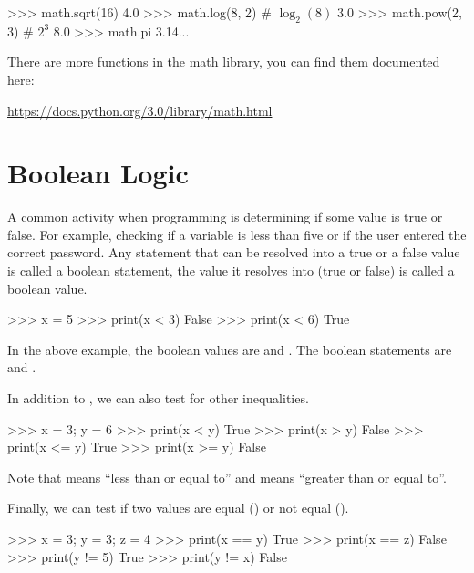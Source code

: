\documentclass[11pt]{cselabheader}
\begin{document}
\begin{pyconcode}
>>> math.sqrt(16)
4.0
>>> math.log(8, 2) # $\log_2(8)$
3.0
>>> math.pow(2, 3) # $2^3$
8.0
>>> math.pi
3.14...
\end{pyconcode}

There are more functions in the math library, you can find them documented here:
\begin{center}
\url{https://docs.python.org/3.0/library/math.html}
\end{center}

\pagebreak
\section{Boolean Logic}
A common activity when programming is determining if some value is true or
false. For example, checking if a variable is less than five or if the user
entered the correct password. Any statement that can be resolved into a true or
a false value is called a boolean statement, the value it resolves into (true or
false) is called a boolean value.

\begin{pyconcode}
>>> x = 5
>>> print(x < 3)
False
>>> print(x < 6)
True
\end{pyconcode}

In the above example, the boolean values are  and
. The boolean statements are  and 
. 

In addition to \pythoninline{<}, we can also test for other
inequalities.

\begin{pyconcode}
>>> x = 3; y = 6
>>> print(x < y)
True
>>> print(x > y)
False
>>> print(x <= y)
True
>>> print(x >= y)
False
\end{pyconcode}

Note that \pythoninline{<=} means ``less than or equal to'' and \pythoninline{>=}
means ``greater than or equal to''. 

Finally, we can test if two values are equal
(\pythoninline{==}) or not equal (\pythoninline{!=}).

\begin{pyconcode}
>>> x = 3; y = 3; z = 4
>>> print(x == y)
True
>>> print(x == z)
False
>>> print(y != 5)
True
>>> print(y != x)
False
\end{pyconcode}
\end{document}
